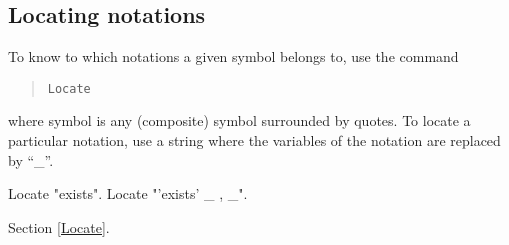 \subsection{Locating notations
\label{LocateSymbol}}

To know to which notations a given symbol belongs to, use the command
\begin{quote}
\tt Locate {\symbolentry}
\end{quote}
where symbol is any (composite) symbol surrounded by quotes. To locate
a particular notation, use a string where the variables of the
notation are replaced by ``\_''.

\Example
\begin{coq_example}
Locate "exists".
Locate "'exists' _ , _".
\end{coq_example}

\SeeAlso Section \ref{Locate}.


